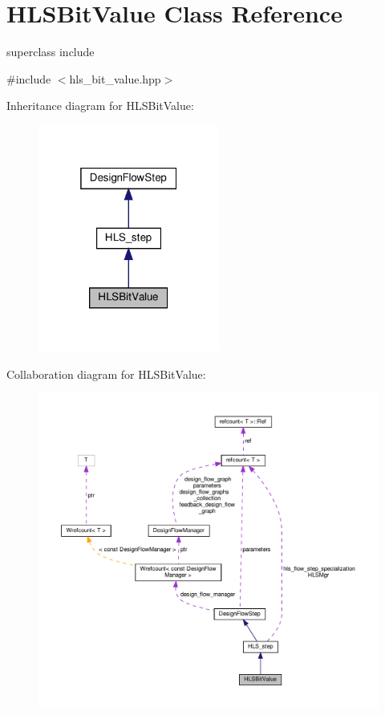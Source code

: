\hypertarget{classHLSBitValue}{}\section{H\+L\+S\+Bit\+Value Class Reference}
\label{classHLSBitValue}


superclass include  




{\ttfamily \#include $<$hls\+\_\+bit\+\_\+value.\+hpp$>$}



Inheritance diagram for H\+L\+S\+Bit\+Value\+:
\nopagebreak
\begin{figure}[H]
\begin{center}
\leavevmode
\includegraphics[width=169pt]{d3/d6a/classHLSBitValue__inherit__graph}
\end{center}
\end{figure}


Collaboration diagram for H\+L\+S\+Bit\+Value\+:
\nopagebreak
\begin{figure}[H]
\begin{center}
\leavevmode
\includegraphics[width=350pt]{d0/d29/classHLSBitValue__coll__graph}
\end{center}
\end{figure}
